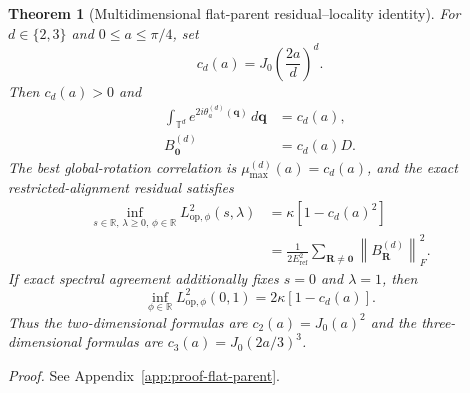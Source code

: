 \documentclass[11pt]{article}
\newcommand{\T}{\mathbb T}
\newcommand{\norm}[1]{\left\lVert #1\right\rVert}
\newtheorem{theorem}{Theorem}[section]
\begin{document}
\begin{theorem}[Multidimensional flat-parent residual--locality identity]
\label{thm:flat-parent}
For $d\in\{2,3\}$ and $0\le a\le\pi/4$, set
\begin{equation}
 c_d(a)=J_0\!\left(\frac{2a}{d}\right)^d.
 \label{eq:flat-correlation-general}
\end{equation}
Then $c_d(a)>0$ and
\begin{align}
 \int_{\T^d}e^{2i\theta_a^{(d)}(\mathbf q)}\,d\mathbf q
 &=c_d(a),
 \label{eq:bessel-factorization}\\
 B_{\mathbf0}^{(d)}&=c_d(a)D.
 \label{eq:onsite-average}
\end{align}
The best global-rotation correlation is
$\mu_{\max}^{(d)}(a)=c_d(a)$, and the exact restricted-alignment residual satisfies
\begin{align}
 \inf_{s\in\mathbb R,\,\lambda\ge0,\,\phi\in\mathbb R}
 L_{\mathrm{op},\phi}^2(s,\lambda)
 &=\kappa\left[1-c_d(a)^2\right]
 \label{eq:flat-residual}\\
 &=\frac{1}{2E_{\mathrm{ref}}^2}
   \sum_{\mathbf R\ne\mathbf0}\norm{B_{\mathbf R}^{(d)}}_F^2.
 \label{eq:flat-tail}
\end{align}
If exact spectral agreement additionally fixes $s=0$ and $\lambda=1$, then
\begin{equation}
 \inf_{\phi\in\mathbb R}L_{\mathrm{op},\phi}^2(0,1)
 =2\kappa\left[1-c_d(a)\right].
 \label{eq:flat-exact-spectrum}
\end{equation}
Thus the two-dimensional formulas are
$c_2(a)=J_0(a)^2$ and the three-dimensional formulas are
$c_3(a)=J_0(2a/3)^3$.
\end{theorem}

\noindent\emph{Proof.} See Appendix~\ref{app:proof-flat-parent}.
\end{document}
